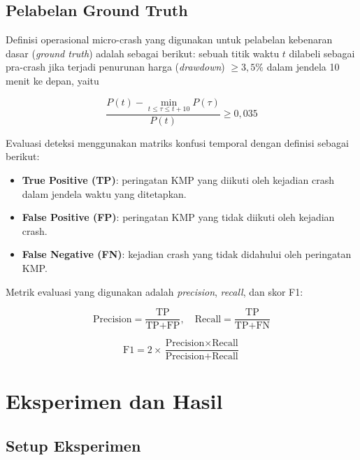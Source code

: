 \documentclass[conference]{IEEEtran}
\begin{document}
\subsection{Pelabelan Ground Truth}

Definisi operasional micro-crash yang digunakan untuk pelabelan kebenaran dasar (\textit{ground truth}) adalah sebagai berikut: sebuah titik waktu $t$ dilabeli sebagai pra-crash jika terjadi penurunan harga (\textit{drawdown}) $\geq 3{,}5\%$ dalam jendela 10 menit ke depan, yaitu

\begin{equation}
\frac{P(t) - \min_{t \leq \tau \leq t+10} P(\tau)}{P(t)} \geq 0{,}035
\label{eq:crash_label}
\end{equation}

Evaluasi deteksi menggunakan matriks konfusi temporal dengan definisi sebagai berikut:

\begin{itemize}
    \item \textbf{True Positive (TP)}: peringatan KMP yang diikuti oleh kejadian crash dalam jendela waktu yang ditetapkan.
    \item \textbf{False Positive (FP)}: peringatan KMP yang tidak diikuti oleh kejadian crash.
    \item \textbf{False Negative (FN)}: kejadian crash yang tidak didahului oleh peringatan KMP.
\end{itemize}

Metrik evaluasi yang digunakan adalah \textit{precision}, \textit{recall}, dan skor F1:

\begin{equation}
\text{Precision} = \frac{\text{TP}}{\text{TP} + \text{FP}}, \quad
\text{Recall} = \frac{\text{TP}}{\text{TP} + \text{FN}}
\label{eq:prec_rec}
\end{equation}

\begin{equation}
\text{F1} = 2 \times \frac{\text{Precision} \times \text{Recall}}{\text{Precision} + \text{Recall}}
\label{eq:f1}
\end{equation}

\section{Eksperimen dan Hasil}

\subsection{Setup Eksperimen}
\end{document}
